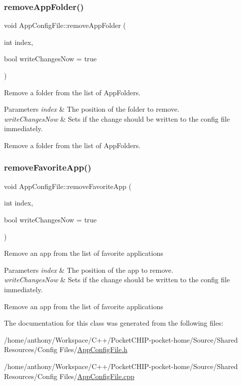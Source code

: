 \subsubsection{\texorpdfstring{remove\+App\+Folder()}{removeAppFolder()}}
{\footnotesize\ttfamily void App\+Config\+File\+::remove\+App\+Folder (\begin{DoxyParamCaption}\item[{int}]{index,  }\item[{bool}]{write\+Changes\+Now = {\ttfamily true} }\end{DoxyParamCaption})}

Remove a folder from the list of App\+Folders.


\begin{DoxyParams}{Parameters}
{\em index} & The position of the folder to remove.\\
\hline
{\em write\+Changes\+Now} & Sets if the change should be written to the config file immediately.\\
\hline
\end{DoxyParams}
Remove a folder from the list of App\+Folders. \mbox{\label{classAppConfigFile_aadece130a132eb7b490e99d980aa0206}} 
\subsubsection{\texorpdfstring{remove\+Favorite\+App()}{removeFavoriteApp()}}
{\footnotesize\ttfamily void App\+Config\+File\+::remove\+Favorite\+App (\begin{DoxyParamCaption}\item[{int}]{index,  }\item[{bool}]{write\+Changes\+Now = {\ttfamily true} }\end{DoxyParamCaption})}

Remove an app from the list of favorite applications


\begin{DoxyParams}{Parameters}
{\em index} & The position of the app to remove.\\
\hline
{\em write\+Changes\+Now} & Sets if the change should be written to the config file immediately.\\
\hline
\end{DoxyParams}
Remove an app from the list of favorite applications 

The documentation for this class was generated from the following files\+:\begin{DoxyCompactItemize}
\item 
/home/anthony/\+Workspace/\+C++/\+Pocket\+C\+H\+I\+P-\/pocket-\/home/\+Source/\+Shared Resources/\+Config Files/\mbox{\hyperlink{AppConfigFile_8h}{App\+Config\+File.\+h}}\item 
/home/anthony/\+Workspace/\+C++/\+Pocket\+C\+H\+I\+P-\/pocket-\/home/\+Source/\+Shared Resources/\+Config Files/\mbox{\hyperlink{AppConfigFile_8cpp}{App\+Config\+File.\+cpp}}\end{DoxyCompactItemize}

